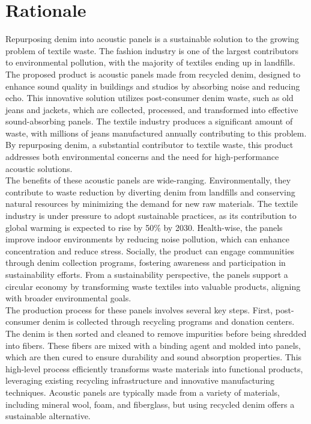 \section{Rationale}
Repurposing denim into acoustic panels is a sustainable solution to the growing problem of textile waste. The fashion industry is one of the largest contributors to environmental pollution, with the majority of textiles ending up in landfills. \\ 


The proposed product is acoustic panels made from recycled denim, designed to enhance sound quality in buildings and studios by absorbing noise and reducing echo. This innovative solution utilizes post-consumer denim waste, such as old jeans and jackets, which are collected, processed, and transformed into effective sound-absorbing panels. The textile industry produces a significant amount of waste, with millions of jeans manufactured annually contributing to this problem. By repurposing denim, a substantial contributor to textile waste, this product addresses both environmental concerns and the need for high-performance acoustic solutions. \\ 

The benefits of these acoustic panels are wide-ranging. Environmentally, they contribute to waste reduction by diverting denim from landfills and conserving natural resources by minimizing the demand for new raw materials. The textile industry is under pressure to adopt sustainable practices, as its contribution to global warming is expected to rise by 50\% by 2030. Health-wise, the panels improve indoor environments by reducing noise pollution, which can enhance concentration and reduce stress. Socially, the product can engage communities through denim collection programs, fostering awareness and participation in sustainability efforts. From a sustainability perspective, the panels support a circular economy by transforming waste textiles into valuable products, aligning with broader environmental goals. \\ 

The production process for these panels involves several key steps. First, post-consumer denim is collected through recycling programs and donation centers. The denim is then sorted and cleaned to remove impurities before being shredded into fibers. These fibers are mixed with a binding agent and molded into panels, which are then cured to ensure durability and sound absorption properties. This high-level process efficiently transforms waste materials into functional products, leveraging existing recycling infrastructure and innovative manufacturing techniques. Acoustic panels are typically made from a variety of materials, including mineral wool, foam, and fiberglass, but using recycled denim offers a sustainable alternative. \\ 


